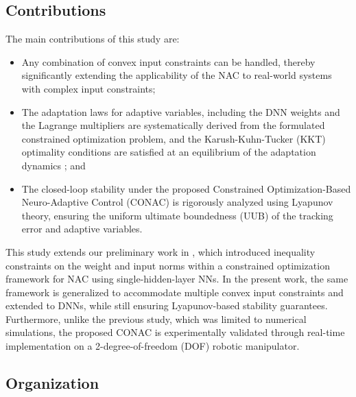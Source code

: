 \documentclass[letterpaper, journal]{IEEEtran}
\begin{document}
\subsection{Contributions}

The main contributions of this study are:
\begin{itemize}

  \item
  Any combination of convex input constraints can be handled, thereby significantly extending the applicability of the NAC to real-world systems with complex input constraints;
  
  \item 
  The adaptation laws for adaptive variables, including the DNN weights and the Lagrange multipliers are systematically derived from the formulated constrained optimization problem, and the Karush-Kuhn-Tucker (KKT) optimality conditions are satisfied at an equilibrium of the adaptation dynamics \cite[Chap. 12, Thm. 12.1]{Nocedal:2006aa}; and

  \item 
  The closed-loop stability under the proposed Constrained Optimization-Based Neuro-Adaptive Control (CONAC) is rigorously analyzed using Lyapunov theory, ensuring the uniform ultimate boundedness (UUB) of the tracking error and adaptive variables.

\end{itemize}

This study extends our preliminary work in \cite{Ryu:2025ab,Ryu:2025aa}, which introduced inequality constraints on the weight and input norms within a constrained optimization framework for NAC using single-hidden-layer NNs. 
In the present work, the same framework is generalized to accommodate multiple convex input constraints and extended to DNNs, while still ensuring Lyapunov-based stability guarantees.
Furthermore, unlike the previous study, which was limited to numerical simulations, the proposed CONAC is experimentally validated through real-time implementation on a 2-degree-of-freedom (DOF) robotic manipulator.

\subsection{Organization}
\end{document}
